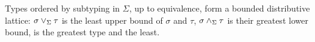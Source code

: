 \begin{lemma}
\label{lem:lattice}
Types ordered by subtyping in $\Sigma$, up to equivalence, form a bounded distributive lattice: $\sigma \vee_{\Sigma} \tau$
is the least upper bound of $\sigma$ and $\tau$, $\sigma \wedge_{\Sigma} \tau$ is their greatest lower bound,
 is the greatest type and  the least.
\end{lemma}
